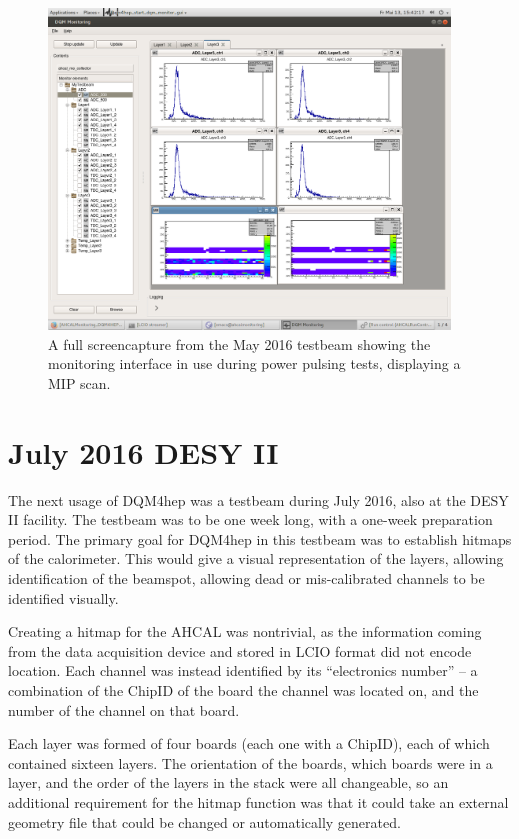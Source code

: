 \begin{figure}[t]
	\centering
	\includegraphics[width=0.95\textwidth]{../Pictures/PowerPulsingMipScans-May2016.png}
	\caption{A full screencapture from the May 2016 testbeam showing the monitoring interface in use during power pulsing tests, displaying a \acrshort{MIP} scan.}
	\label{figure:aida/may2016/overview}
\end{figure}

\section{July 2016 DESY II}
The next usage of \acrshort{DQM4hep} was a testbeam during July 2016, also at the DESY II facility. The testbeam was to be one week long, with a one-week preparation period. The primary goal for \acrshort{DQM4hep} in this testbeam was to establish hitmaps of the calorimeter. This would give a visual representation of the layers, allowing identification of the beamspot, allowing dead or mis-calibrated channels to be identified visually.

Creating a hitmap for the \acrshort{AHCAL} was nontrivial, as the information coming from the data acquisition device and stored in LCIO format did not encode location. Each channel was instead identified by its ``electronics number'' -- a combination of the ChipID of the board the channel was located on, and the number of the channel on that board.

Each layer was formed of four boards (each one with a ChipID), each of which contained sixteen layers. The orientation of the boards, which boards were in a layer, and the order of the layers in the stack were all changeable, so an additional requirement for the hitmap function was that it could take an external geometry file that could be changed or automatically generated. 

